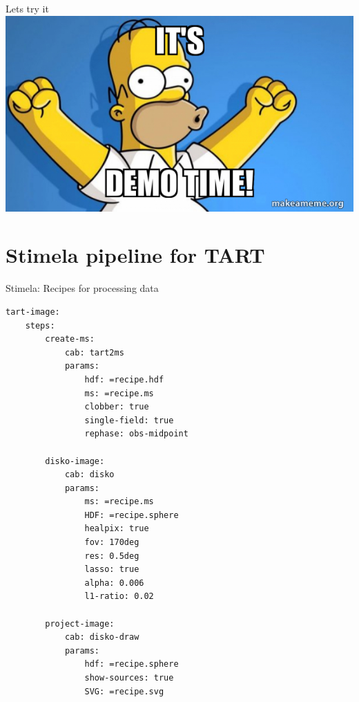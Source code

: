 \documentclass[ignorenonframetext]{beamer}
\begin{document}
\begin{frame}{Lets try it}
\includegraphics[width=\linewidth]{images/demo-time.jpg}
\end{frame}


% 
% 



\section{Stimela pipeline for TART}

\begin{frame}[fragile]{Stimela: Recipes for processing data}

\begin{lstlisting}[style=yaml]
tart-image:
    steps:
        create-ms:
            cab: tart2ms
            params:
                hdf: =recipe.hdf
                ms: =recipe.ms
                clobber: true
                single-field: true
                rephase: obs-midpoint

        disko-image:
            cab: disko
            params:
                ms: =recipe.ms
                HDF: =recipe.sphere
                healpix: true
                fov: 170deg
                res: 0.5deg
                lasso: true
                alpha: 0.006
                l1-ratio: 0.02

        project-image:
            cab: disko-draw
            params:
                hdf: =recipe.sphere
                show-sources: true
                SVG: =recipe.svg
\end{lstlisting}
\end{frame}
\end{document}
